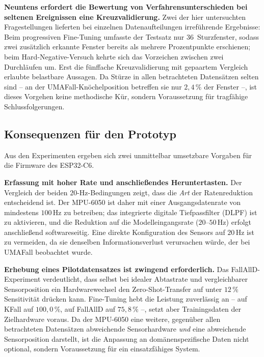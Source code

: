 \documentclass[11pt,a4paper,oneside]{report}
\begin{document}
\textbf{Neuntens erfordert die Bewertung von Verfahrensunterschieden
bei seltenen Ereignissen eine Kreuzvalidierung.} Zwei der hier
untersuchten Fragestellungen lieferten bei einzelnen
Datenaufteilungen irreführende Ergebnisse: Beim progressiven
Fine-Tuning umfasste der Testsatz nur 36~Sturzfenster, sodass zwei
zusätzlich erkannte Fenster bereits als mehrere Prozentpunkte
erschienen; beim Hard-Negative-Versuch kehrte sich das Vorzeichen
zwischen zwei Durchläufen um. Erst die fünffache Kreuzvalidierung
mit gepaartem Vergleich erlaubte belastbare Aussagen. Da Stürze in
allen betrachteten Datensätzen selten sind -- an der
UMAFall-Knöchelposition betreffen sie nur $2{,}4\,\%$ der Fenster --,
ist dieses Vorgehen keine methodische Kür, sondern Voraussetzung für
tragfähige Schlussfolgerungen.

\subsection{Konsequenzen für den Prototyp}
\label{sec:konsequenzen}

Aus den Experimenten ergeben sich zwei unmittelbar umsetzbare
Vorgaben für die Firmware des ESP32-C6.

\textbf{Erfassung mit hoher Rate und anschließendes Heruntertasten.}
Der Vergleich der beiden $20$-Hz-Bedingungen zeigt, dass die
\emph{Art} der Ratenreduktion entscheidend ist. Der MPU-6050 ist
daher mit einer Ausgangsdatenrate von mindestens $100$\,Hz zu
betreiben; das integrierte digitale Tiefpassfilter (DLPF) ist zu
aktivieren, und die Reduktion auf die Modelleingangsrate
($20$--$50$\,Hz) erfolgt anschließend softwareseitig. Eine direkte
Konfiguration des Sensors auf $20$\,Hz ist zu vermeiden, da sie
denselben Informationsverlust verursachen würde, der bei UMAFall
beobachtet wurde.

\textbf{Erhebung eines Pilotdatensatzes ist zwingend erforderlich.}
Das FallAllD-Experiment verdeutlicht, dass selbst bei idealer
Abtastrate und vergleichbarer Sensorposition ein Hardwarewechsel
den Zero-Shot-Transfer auf unter $12\,\%$ Sensitivität drücken kann.
Fine-Tuning hebt die Leistung zuverlässig an -- auf KFall auf
$100{,}0\,\%$, auf FallAllD auf $75{,}8\,\%$ --, setzt aber
Trainingsdaten der Zielhardware voraus. Da der MPU-6050 eine weitere,
gegenüber allen betrachteten Datensätzen abweichende Sensorhardware
\emph{und} eine abweichende Sensorposition darstellt, ist die
Anpassung an domänenspezifische Daten nicht optional, sondern
Voraussetzung für ein einsatzfähiges System.
\end{document}
